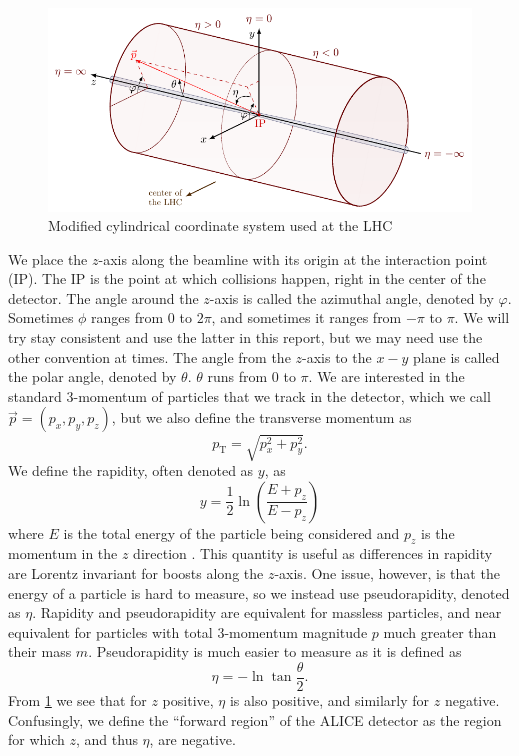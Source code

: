 \documentclass[11pt]{article}
\numberwithin{equation}{section}
\numberwithin{figure}{section}
\numberwithin{table}{section}
\begin{document}
\begin{figure}[h]
    \begin{center}
        \includegraphics[width=.8\textwidth]{Figs/coords.pdf}
        \caption{Modified cylindrical coordinate system used at the LHC \cite{coords}}
        \label{fig:coords}
    \end{center}
\end{figure}

We place the $z$-axis along the beamline with its origin at the interaction point (IP). The IP is the point at which collisions happen, right in the center of the detector. The angle around the $z$-axis is called the azimuthal angle, denoted by $\varphi$. Sometimes $\phi$ ranges from 0 to $2\pi$, and sometimes it ranges from $-\pi$ to $\pi$. We will try stay consistent and use the latter in this report, but we may need use the other convention at times. The angle from the $z$-axis to the $x-y$ plane is called the polar angle, denoted by $\theta$. $\theta$ runs from 0 to $\pi$. We are interested in the standard 3-momentum of particles that we track in the detector, which we call $\vec{p}=(p_x,p_y,p_z)$, but we also define the transverse momentum as 
\begin{equation}
    p_{\mathrm{T}}=\sqrt{p_x^2 + p_y^2}.
    \label{eqn:transverse momentum}
\end{equation}
We define the rapidity, often denoted as $y$, as
\begin{equation}
    y=\frac 12 \ln\left(\frac{E+p_z}{E-p_z}\right)
    \label{eqn:rapidity}
\end{equation}
where $E$ is the total energy of the particle being considered and $p_z$ is the momentum in the $z$ direction \cite{kar_exp_phys}. This quantity is useful as differences in rapidity are Lorentz invariant for boosts along the $z$-axis. One issue, however, is that the energy of a particle is hard to measure, so we instead use pseudorapidity, denoted as $\eta$. Rapidity and pseudorapidity are equivalent for massless particles, and near equivalent for particles with total 3-momentum magnitude $p$ much greater than their mass $m$. Pseudorapidity is much easier to measure as it is defined as \cite{kar_exp_phys}
\begin{equation}
    \eta=-\ln\tan\frac{\theta}{2}.
    \label{eqn:pseudorapidity}
\end{equation}
From \cref{fig:coords} we see that for $z$ positive, $\eta$ is also positive, and similarly for $z$ negative. Confusingly, we define the ``forward region'' of the ALICE detector as the region for which $z$, and thus $\eta$, are negative. 
\end{document}
